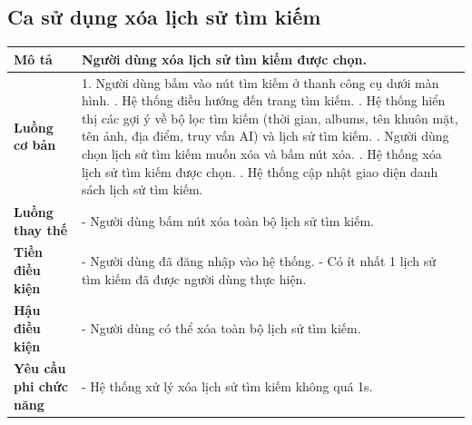 \subsection{Ca sử dụng xóa lịch sử tìm kiếm}

\vspace{0.5cm}

\noindent 
\begin{tabularx}{\linewidth}{| l | X |} 
\hline 
\textbf{Mô tả} & Người dùng xóa lịch sử tìm kiếm được chọn. \\
\hline 
\textbf{Luồng cơ bản} & 1. Người dùng bấm vào nút tìm kiếm ở thanh công cụ dưới màn hình. \newline
                       2. Hệ thống điều hướng đến trang tìm kiếm. \newline
                       3. Hệ thống hiển thị các gợi ý về bộ lọc tìm kiếm (thời gian, albums, tên khuôn mặt, tên ảnh, địa điểm, truy vấn AI) và lịch sử tìm kiếm. \newline
                       4. Người dùng chọn lịch sử tìm kiếm muốn xóa và bấm nút xóa. \newline
                       5. Hệ thống xóa lịch sử tìm kiếm được chọn. \newline
                       6. Hệ thống cập nhật giao diện danh sách lịch sử tìm kiếm. \\
\hline
\textbf{Luồng thay thế} & - Người dùng bấm nút xóa toàn bộ lịch sử tìm kiếm. \\
\hline
\textbf{Tiền điều kiện} & - Người dùng đã đăng nhập vào hệ thống. \newline
                          - Có ít nhất 1 lịch sử tìm kiếm đã được người dùng thực hiện. \\
\hline
\textbf{Hậu điều kiện} & - Người dùng có thể xóa toàn bộ lịch sử tìm kiếm. \\
\hline 
\textbf{Yêu cầu phi chức năng} & - Hệ thống xử lý xóa lịch sử tìm kiếm không quá 1s. \\
\hline 
\end{tabularx}

\vspace{0.8cm}

